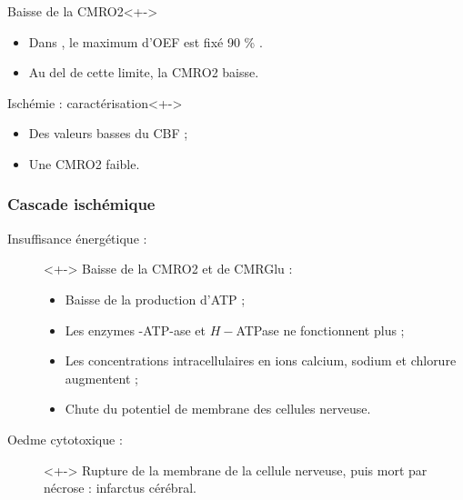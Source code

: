 \begin{frame}
%
\begin{block}{Baisse de la CMRO2}<+->
\begin{itemize}
\item<+-> Dans \cite{Duval_JCBFM_02}, le maximum d'OEF est fix\'e  90 \% .
\item<+-> Au del de cette limite, la CMRO2 baisse.
\end{itemize}
\end{block}

\begin{block}{Isch\'emie : caract\'erisation}<+->
\begin{itemize}
\item<+-> Des valeurs basses du CBF ;
\item<+-> Une CMRO2 faible.
\end{itemize}
\end{block}
%
\end{frame}




\begin{frame}
\frametitle{Cascade isch\'emique}
\begin{description}
\item[Insuffisance \'energ\'etique :]<+-> Baisse de la CMRO2 et de CMRGlu :
\begin{itemize}
\item Baisse de la production d'ATP ;
\item Les enzymes -ATP-ase et $H-$ATPase ne fonctionnent plus ;
\item Les concentrations intracellulaires en ions calcium, sodium et chlorure augmentent ;
\item Chute du potentiel de membrane des cellules nerveuse.
\end{itemize}
%
\item[Oedme cytotoxique :]<+-> Rupture de la membrane de la cellule nerveuse, puis mort par n\'ecrose : infarctus c\'er\'ebral.
\end{description}
\end{frame}

